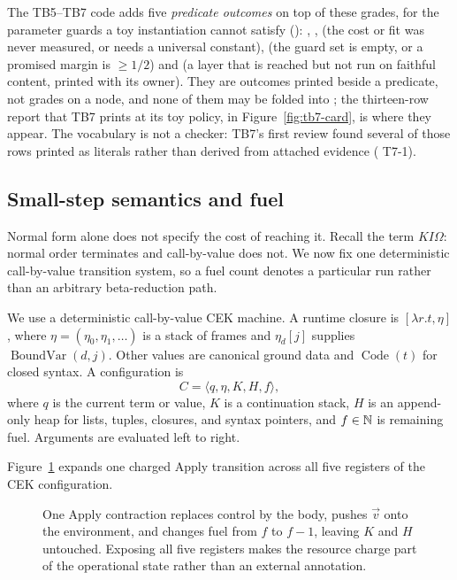 The TB5--TB7 code adds five \emph{predicate outcomes} on top of these
grades, for the parameter guards a toy instantiation cannot satisfy
(): , ,
 (the cost or fit was never measured, or needs a universal
constant),  (the guard set is empty, or a promised margin is
\(\geq1/2\)) and  (a layer that is reached but not run on
faithful content, printed with its owner).  They are outcomes printed beside a
predicate, not grades on a node, and none of them may be folded into
; the thirteen-row report that TB7 prints at its toy policy, in
Figure~\ref{fig:tb7-card}, is where they appear.  The vocabulary is not a
checker: TB7's first review found several of those rows printed as literals
rather than derived from attached evidence ( T7-1).

\subsection{Small-step semantics and fuel}

\begin{reminder}
Normal form alone does not specify the cost of reaching it.  Recall the term
\(K I\Omega\): normal order terminates and call-by-value does not.  We now fix
one deterministic call-by-value transition system, so a fuel count denotes a
particular run rather than an arbitrary beta-reduction path.
\end{reminder}

We use a deterministic call-by-value CEK machine.  A runtime closure is
\([\lambda r.t,\eta]\), where \(\eta=(\eta_0,\eta_1,\ldots)\) is a stack of
frames and \(\eta_d[j]\) supplies \(\operatorname{BoundVar}(d,j)\).  Other
values are canonical ground data and \(\operatorname{Code}(t)\) for closed
syntax.  A configuration is
\[
 C=\langle q,\eta,K,H,f\rangle,
\]
where \(q\) is the current term or value, \(K\) is a continuation stack,
\(H\) is an append-only heap for lists, tuples, closures, and syntax pointers,
and \(f\in\mathbb N\) is remaining fuel.  Arguments are evaluated left to right.

Figure~\ref{fig:cek-config} expands one charged Apply transition across all five
registers of the CEK configuration.
\begin{figure}[t]
\centering

\caption{One Apply contraction replaces control by the body, pushes \(\vec v\) onto the environment, and changes fuel from \(f\) to \(f-1\), leaving \(K\) and \(H\) untouched.  Exposing all five registers makes the resource charge part of the operational state rather than an external annotation.}
\label{fig:cek-config}
\end{figure}

